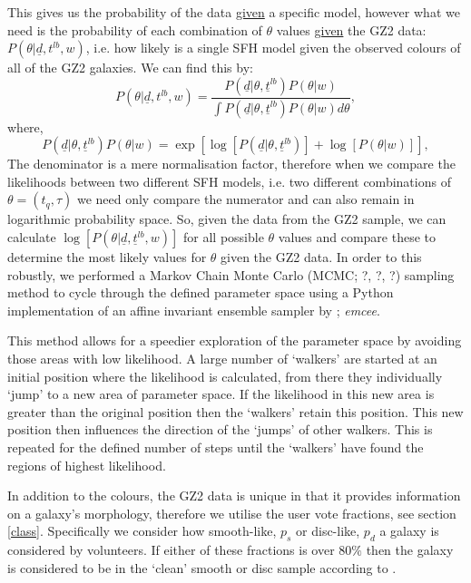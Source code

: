 \documentclass{mn2e}
\begin{document}
This gives us the probability of the data \underline{given} a specific model, however what we need is the probability of each combination of $\theta$ values \underline{given} the GZ2 data: $P(\theta|\underline{d}, t^{lb}, w)$, i.e. how likely is a single SFH model given the observed colours of all of the GZ2 galaxies. We can find this by:
\begin{equation*}
P(\theta|\underline{d}, t^{lb}, w) = \frac{P(\underline{d}|\theta, \underline{t}^{lb})P(\theta | w)}{\int P(\underline{d}|\theta, \underline{t}^{lb})P(\theta | w) d\theta},
\end{equation*}
where,
\begin{equation*}
P(\underline{d}|\theta, \underline{t}^{lb})P(\theta | w) = \exp{\left[\log{[P(\underline{d}|\theta, \underline{t}^{lb})]} + \log{[P(\theta | w)]}\right]},
\end{equation*}
The denominator is a mere normalisation factor, therefore when we compare the likelihoods between two different SFH models, i.e. two different combinations of $\theta = (t_{q}, \tau)$ we need only compare the numerator and can also remain in logarithmic probability space. So, given the data from the GZ2 sample, we can calculate $\log[P(\theta|\underline{d}, \underline{t}^{lb}, w)]$ for all possible $\theta$ values and compare these to determine the most likely values for $\theta$ given the GZ2 data. In order to this robustly, we performed a Markov Chain Monte Carlo (MCMC; ?, ?, ?) sampling method to cycle through the defined parameter space using a Python implementation of an affine invariant ensemble sampler by \cite{Dan}; \emph{emcee}.

This method allows for a speedier exploration of the parameter space by avoiding those areas with low likelihood. A large number of `walkers' are started at an initial position where the likelihood is calculated, from there they individually `jump' to a new area of parameter space. If the likelihood in this new area is greater than the original position then the `walkers' retain this position. This new position then influences the direction of the  `jumps' of other walkers.  This is repeated for the defined number of steps until the `walkers' have found the regions of highest likelihood.

In addition to the colours, the GZ2 data is unique in that it provides information on a galaxy's morphology, therefore we utilise the user vote fractions, see section \ref{class}. Specifically we consider how smooth-like, $p_s$ or disc-like, $p_d$ a galaxy is considered by volunteers. If either of these fractions is over $80\%$ then the galaxy is considered to be in the `clean' smooth or disc sample according to \citet{GZ2}. 
\end{document}
